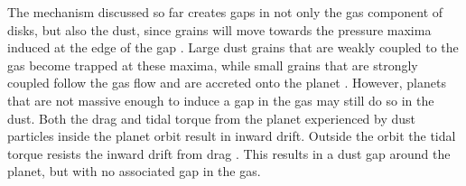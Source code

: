 The mechanism discussed so far creates gaps in not only the gas component of disks, but also the dust, since grains will move towards the pressure maxima induced at the edge of the gap \citep{paardekooper2004}. 
Large dust grains that are weakly coupled to the gas become trapped at these maxima, while small grains that are strongly coupled follow the gas flow and are accreted onto the planet \citep{paardekooper2006,fouchet2007}. 
However, planets that are not massive enough to induce a gap in the gas may still do so in the dust. 
Both the drag and tidal torque from the planet experienced by dust particles inside the planet orbit result in inward drift. Outside the orbit the tidal torque resists the inward drift from drag \citep{dipierro2016}. 
This results in a dust gap around the planet, but with no associated gap in the gas.